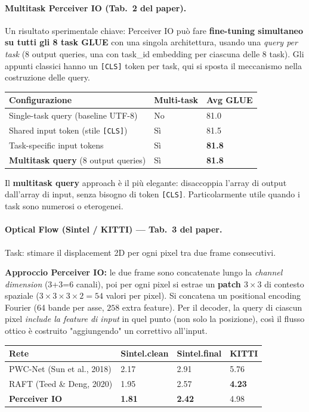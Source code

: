 \documentclass[
  11pt,
]{article}
\begin{document}
\paragraph{Multitask Perceiver IO (Tab.\ 2 del paper).} Un risultato sperimentale chiave: Perceiver IO può fare \textbf{fine-tuning simultaneo su tutti gli 8 task GLUE} con una singola architettura, usando una \emph{query per task} (8 output queries, una con task\_id embedding per ciascuna delle 8 task). Gli appunti classici hanno un \texttt{[CLS]} token per task, qui si sposta il meccanismo nella costruzione delle query.

{\small
\begin{longtable}{@{}p{5.5cm} p{3cm} p{3cm}@{}}
\toprule
\textbf{Configurazione} & \textbf{Multi-task} & \textbf{Avg GLUE} \\
\midrule
\endhead
Single-task query (baseline UTF-8) & No & 81.0 \\[2pt]
Shared input token (stile \texttt{[CLS]}) & Sì & 81.5 \\[2pt]
Task-specific input tokens & Sì & \textbf{81.8} \\[2pt]
\textbf{Multitask query} (8 output queries) & Sì & \textbf{81.8} \\
\bottomrule
\end{longtable}
}

Il \textbf{multitask query} approach è il più elegante: disaccoppia l'array di output dall'array di input, senza bisogno di token \texttt{[CLS]}. Particolarmente utile quando i task sono numerosi o eterogenei.

\paragraph{Optical Flow (Sintel / KITTI) --- Tab.\ 3 del paper.} Task: stimare il displacement 2D per ogni pixel tra due frame consecutivi.

\textbf{Approccio Perceiver IO:} le due frame sono concatenate lungo la \emph{channel dimension} (3+3=6 canali), poi per ogni pixel si estrae un \textbf{patch $3\times 3$} di contesto spaziale ($3 \times 3 \times 3 \times 2 = 54$ valori per pixel). Si concatena un positional encoding Fourier (64 bande per asse, $258$ extra feature). Per il decoder, la query di ciascun pixel \emph{include la feature di input} in quel punto (non solo la posizione), così il flusso ottico è costruito "aggiungendo" un correttivo all'input.

{\small
\begin{longtable}{@{}p{3.8cm} p{2.8cm} p{2.8cm} p{2.5cm}@{}}
\toprule
\textbf{Rete} & \textbf{Sintel.clean} & \textbf{Sintel.final} & \textbf{KITTI} \\
\midrule
\endhead
PWC-Net (Sun et al., 2018) & 2.17 & 2.91 & 5.76 \\[2pt]
RAFT (Teed \& Deng, 2020) & 1.95 & 2.57 & \textbf{4.23} \\[2pt]
\textbf{Perceiver IO} & \textbf{1.81} & \textbf{2.42} & 4.98 \\
\bottomrule
\end{longtable}
}
\end{document}
